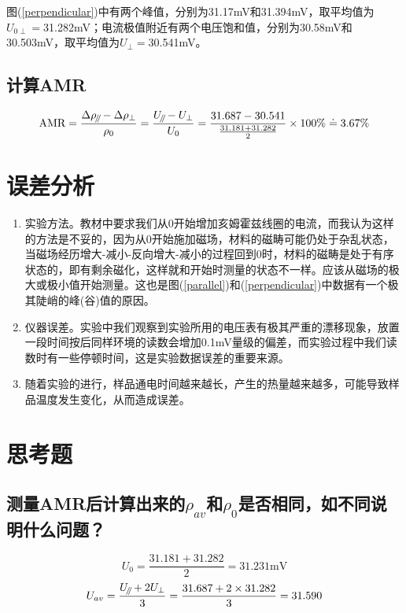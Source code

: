\documentclass[a4paper]{article}
\newcommand{\parallelsum}{\mathbin{\!/\mkern-5mu/\!}}
\begin{document}
图(\ref{perpendicular})中有两个峰值，分别为31.17mV和31.394mV，取平均值为$U_{0\perp}=$31.282mV；电流极值附近有两个电压饱和值，分别为30.58mV和30.503mV，取平均值为$U_{\perp}=$30.541mV。

\newpage
\subsection{计算AMR}
\begin{equation}
\text{AMR} = \frac{\Delta\rho_{\parallelsum} - \Delta\rho_{\perp}}{\rho_{0}} = \frac{U_{\parallelsum} - U_{\perp}}{U_{0}} = \frac{31.687 - 30.541}{\frac{31.181+31.282}{2}}\times 100\% \doteq 3.67\%\label{AMR}
\end{equation}

\section{误差分析}
\begin{enumerate}
	\item 实验方法。教材中要求我们从0开始增加亥姆霍兹线圈的电流，而我认为这样的方法是不妥的，因为从0开始施加磁场，材料的磁畴可能仍处于杂乱状态，当磁场经历增大-减小-反向增大-减小的过程回到0时，材料的磁畴是处于有序状态的，即有剩余磁化，这样就和开始时测量的状态不一样。应该从磁场的极大或极小值开始测量。这也是图(\ref{parallel})和(\ref{perpendicular})中数据有一个极其陡峭的峰(谷)值的原因。
	\item 仪器误差。实验中我们观察到实验所用的电压表有极其严重的漂移现象，放置一段时间按后同样环境的读数会增加0.1mV量级的偏差，而实验过程中我们读数时有一些停顿时间，这是实验数据误差的重要来源。
	\item 随着实验的进行，样品通电时间越来越长，产生的热量越来越多，可能导致样品温度发生变化，从而造成误差。
\end{enumerate}

\section{思考题}
\subsection{测量AMR后计算出来的$\rho_{av}$和$\rho_0$是否相同，如不同说明什么问题？}
\begin{equation}
U_{0} = \frac{31.181+31.282}{2} = 31.231\text{mV}
\end{equation}
\begin{equation}
U_{av} = \frac{U_{\parallelsum}+2U_{\perp}}{3} = \frac{31.687+2\times 31.282}{3} = 31.590
\end{equation}
\end{document}
